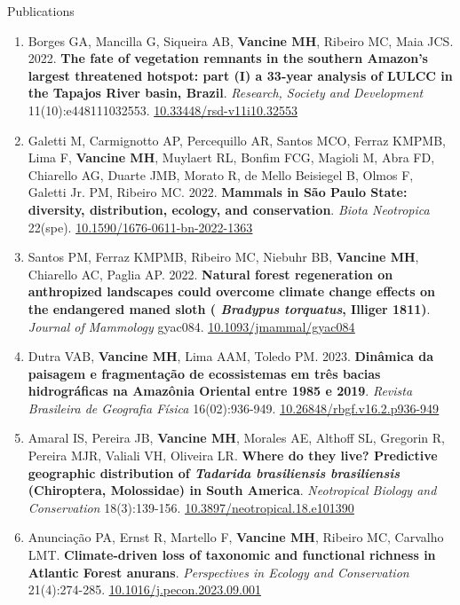 \documentclass{resume}
\begin{document}
\begin{rSection}{Publications}
\begin{enumerate}
\item Borges GA, Mancilla G, Siqueira AB, {\bf Vancine MH}, Ribeiro MC, Maia JCS. 2022. {\bf The fate of vegetation remnants in the southern Amazon’s largest threatened hotspot: part (I) a 33-year analysis of LULCC in the Tapajos River basin, Brazil}. {\it Research, Society and Development} 11(10):e448111032553. \href{https://doi.org/10.33448/rsd-v11i10.32553}{\underline{10.33448/rsd-v11i10.32553}}

\item Galetti M, Carmignotto AP, Percequillo AR, Santos MCO, Ferraz KMPMB, Lima F, {\bf Vancine MH}, Muylaert RL, Bonfim FCG, Magioli M, Abra FD, Chiarello AG, Duarte JMB, Morato R, de Mello Beisiegel B, Olmos F, Galetti Jr. PM, Ribeiro MC. 2022. {\bf Mammals in São Paulo State: diversity, distribution, ecology, and conservation}. {\it Biota Neotropica} 22(spe). \href{https://doi.org/10.1590/1676-0611-bn-2022-1363}{\underline{10.1590/1676-0611-bn-2022-1363}}

\item Santos PM, Ferraz KMPMB, Ribeiro MC, Niebuhr BB, {\bf Vancine MH}, Chiarello AC, Paglia AP. 2022. {\bf Natural forest regeneration on anthropized landscapes could overcome climate change effects on the endangered maned sloth (\textbf{\textit{ Bradypus torquatus}}, Illiger 1811)}. {\it Journal of Mammology} gyac084. \href{https://doi.org/10.1093/jmammal/gyac084}{\underline{10.1093/jmammal/gyac084}}

\item Dutra VAB, {\bf Vancine MH}, Lima AAM, Toledo PM. 2023. {\bf Dinâmica da paisagem e fragmentação de ecossistemas em três bacias hidrográficas na Amazônia Oriental entre 1985 e 2019}. {\it Revista Brasileira de Geografia Física} 16(02):936-949. \href{https://doi.org/10.26848/rbgf.v16.2.p936-949}{\underline{10.26848/rbgf.v16.2.p936-949}}

\item Amaral IS, Pereira JB, {\bf Vancine MH}, Morales AE, Althoff SL, Gregorin R, Pereira MJR, Valiali VH, Oliveira LR. {\bf Where do they live? Predictive geographic distribution of \textbf{\textit{Tadarida brasiliensis brasiliensis}} (Chiroptera, Molossidae) in South America}. {\it Neotropical Biology and Conservation} 18(3):139-156. \href{https://doi.org/10.3897/neotropical.18.e101390}{\underline{10.3897/neotropical.18.e101390}}

\item Anunciação PA, Ernst R, Martello F, {\bf Vancine MH}, Ribeiro MC, Carvalho LMT. {\bf Climate-driven loss of taxonomic and functional richness in Atlantic Forest anurans}. {\it Perspectives in Ecology and Conservation} 21(4):274-285. \href{https://doi.org/10.1016/j.pecon.2023.09.001}{\underline{10.1016/j.pecon.2023.09.001}}


\end{enumerate}
\end{rSection}
\end{document}
